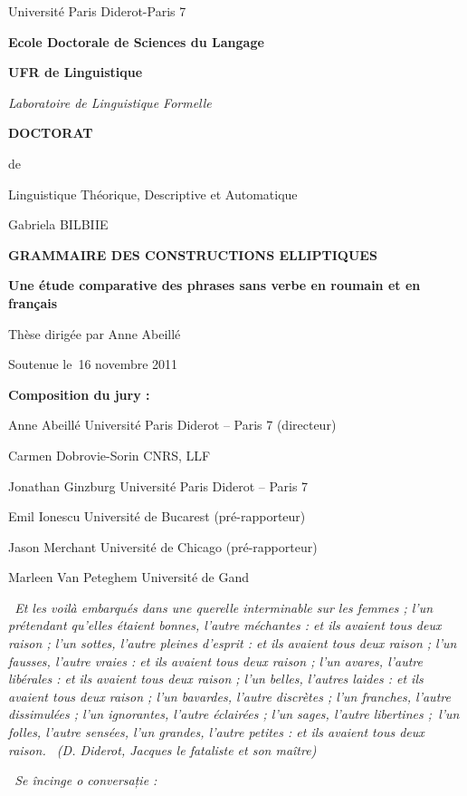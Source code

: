 
\setcounter{page}{1}
{
Université Paris Diderot-Paris 7
}

{\bfseries
Ecole Doctorale de Sciences du Langage
}

{\bfseries
UFR de Linguistique
}

{\itshape
Laboratoire de Linguistique Formelle
}

{\bfseries
DOCTORAT\textmd{} 
}

{
de 
}

{
Linguistique Théorique, Descriptive et Automatique
}

{
Gabriela BILBIIE
}

{\bfseries
GRAMMAIRE DES CONSTRUCTIONS ELLIPTIQUES
}

{\bfseries
Une étude comparative des phrases sans verbe en roumain et en français
}

{
Thèse dirigée par Anne Abeillé
}

{
Soutenue le~16 novembre 2011
}

{\bfseries
Composition du jury :
}

Anne Abeillé      Université Paris Diderot -- Paris 7 (directeur)

Carmen Dobrovie-Sorin  CNRS, LLF

Jonathan Ginzburg    Université Paris Diderot -- Paris 7 

Emil Ionescu      Université de Bucarest (pré-rapporteur)

Jason Merchant    Université de Chicago (pré-rapporteur)

Marleen Van Peteghem   Université de Gand

 
{\itshape
{\guillemotleft}~Et les voilà embarqués dans une querelle interminable sur les femmes ; l'un prétendant qu'elles étaient bonnes, l'autre méchantes : et ils avaient tous deux raison ; l'un sottes, l'autre pleines d'esprit : et ils avaient tous deux raison ; l'un fausses, l'autre vraies : et ils avaient tous deux raison ; l'un avares, l'autre libérales : et ils avaient tous deux raison ; l'un belles, l'autres laides : et ils avaient tous deux raison ; l'un bavardes, l'autre discrètes ; l'un franches, l'autre dissimulées ; l'un ignorantes, l'autre éclairées ; l'un sages, l'autre libertines ;~l'un folles, l'autre sensées, l'un grandes, l'autre petites : et ils avaient tous deux raison.~{\guillemotright} (D. Diderot, \textup{Jacques le fataliste et son maître})}

{\itshape
{\guillemotleft}~Se încinge o conversație :} 

